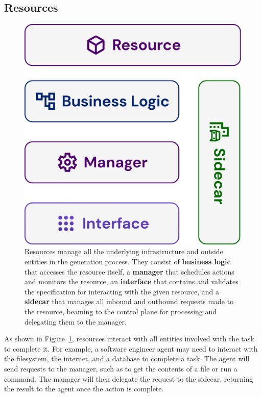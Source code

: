 \documentclass[a4paper,twocolumn,11pt]{quantumarticle}
\begin{document}
\subsection{Resources}
\begin{figure}[t]
  \includegraphics[width=\columnwidth]{figures/resource.pdf}
  \caption{Resources manage all the underlying infrastructure and outside entities in the generation process. They consist of \textbf{business logic} that accesses the resource itself, a \textbf{manager} that schedules actions and monitors the resource, an \textbf{interface} that contains and validates the specification for interacting with the given resource, and a \textbf{sidecar} that manages all inbound and outbound requests made to the resource, beaming to the control plane for processing and delegating them to the manager.}
  \label{fig:resources}
\end{figure}
As shown in Figure~\ref{fig:resources}, resources interact with all entities involved with the task to complete it. For example, a software engineer agent may need to interact with the filesystem, the internet, and a database to complete a task. The agent will send requests to the manager, such as to get the contents of a file or run a command. The manager will then delegate the request to the sidecar, returning the result to the agent once the action is complete.
\end{document}
